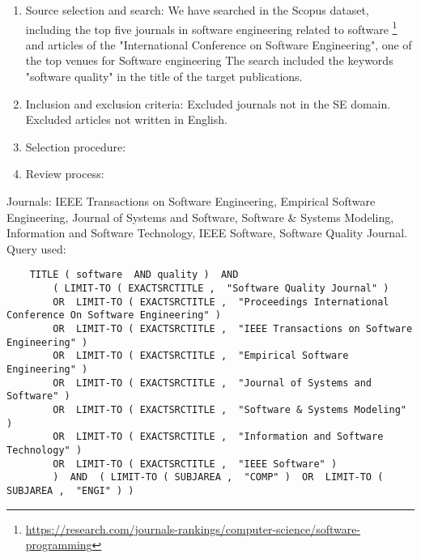 \begin{enumerate}
    \item Source selection and search: We have searched in the Scopus dataset, including the top five journals in
    software engineering related to software \footnote{\url{https://research.com/journals-rankings/computer-science/software-programming}}
    and articles of the  "International Conference on Software Engineering", one of the top venues for Software engineering
    The search included the keywords "software quality" in the title of the target publications.
    \item Inclusion and exclusion criteria: Excluded journals not in the SE domain. Excluded articles not written in English.
    \item Selection procedure:
    \item Review process:
\end{enumerate}

Journals: IEEE Transactions on Software Engineering, Empirical Software Engineering, Journal of Systems and Software, Software \& Systems Modeling, 
Information and Software Technology, IEEE Software, Software Quality Journal. Query used:

\tiny
\begin{verbatim}
    TITLE ( software  AND quality )  AND  
        ( LIMIT-TO ( EXACTSRCTITLE ,  "Software Quality Journal" )  
        OR  LIMIT-TO ( EXACTSRCTITLE ,  "Proceedings International Conference On Software Engineering" ) 
        OR  LIMIT-TO ( EXACTSRCTITLE ,  "IEEE Transactions on Software Engineering" )
        OR  LIMIT-TO ( EXACTSRCTITLE ,  "Empirical Software Engineering" ) 
        OR  LIMIT-TO ( EXACTSRCTITLE ,  "Journal of Systems and Software" ) 
        OR  LIMIT-TO ( EXACTSRCTITLE ,  "Software & Systems Modeling" ) 
        OR  LIMIT-TO ( EXACTSRCTITLE ,  "Information and Software Technology" )  
        OR  LIMIT-TO ( EXACTSRCTITLE ,  "IEEE Software" )   
        )  AND  ( LIMIT-TO ( SUBJAREA ,  "COMP" )  OR  LIMIT-TO ( SUBJAREA ,  "ENGI" ) )  
\end{verbatim}
\small

